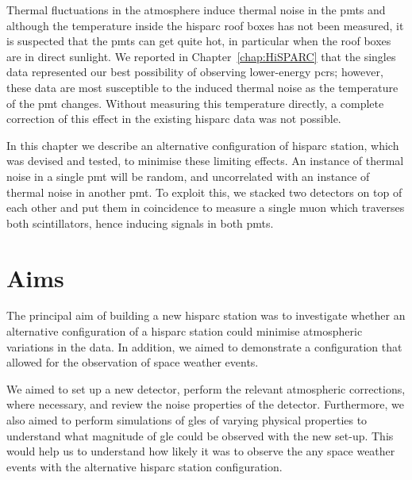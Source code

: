 Thermal fluctuations in the atmosphere induce thermal noise in the \glspl{pmt} and although the temperature inside the \gls{hisparc} roof boxes has not been measured, it is suspected that the \glspl{pmt} can get quite hot, in particular when the roof boxes are in direct sunlight. We reported in Chapter~\ref{chap:HiSPARC} that the singles data represented our best possibility of observing lower-energy \glspl{pcr}; however, these data are most susceptible to the induced thermal noise as the temperature of the \gls{pmt} changes. Without measuring this temperature directly, a complete correction of this effect in the existing \gls{hisparc} data was not possible.

In this chapter we describe an alternative configuration of \gls{hisparc} station, which was devised and tested, to minimise these limiting effects. An instance of thermal noise in a single \gls{pmt} will be random, and uncorrelated with an instance of thermal noise in another \gls{pmt}. To exploit this, we stacked two detectors on top of each other and put them in coincidence to measure a single muon which traverses both scintillators, hence inducing signals in both \glspl{pmt}.




\section{Aims}\label{sec:HS_14008_aims}

The principal aim of building a new \gls{hisparc} station was to investigate whether an alternative configuration of a \gls{hisparc} station could minimise atmospheric variations in the data. In addition, we aimed to demonstrate a configuration that allowed for the observation of space weather events.

We aimed to set up a new detector, perform the relevant atmospheric corrections, where necessary, and review the noise properties of the detector. Furthermore, we also aimed to perform simulations of \glspl{gle} of varying physical properties to understand what magnitude of \gls{gle} could be observed with the new set-up. This would help us to understand how likely it was to observe the any space weather events with the alternative \gls{hisparc} station configuration.



